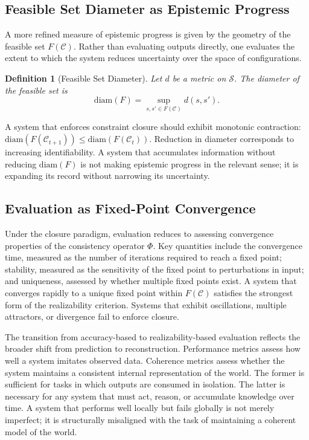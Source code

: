 \documentclass[12pt, oneside]{article}
\newtheorem{definition}{Definition}
\begin{document}
\subsection{Feasible Set Diameter as Epistemic Progress}

A more refined measure of epistemic progress is given by the geometry of the feasible set $F(\mathcal{C})$. Rather than evaluating outputs directly, one evaluates the extent to which the system reduces uncertainty over the space of configurations.

\begin{definition}[Feasible Set Diameter]
Let $d$ be a metric on $\mathcal{S}$. The diameter of the feasible set is
\begin{equation}
  \mathrm{diam}(F) = \sup_{s, s' \in F(\mathcal{C})} d(s, s').
\end{equation}
\end{definition}

A system that enforces constraint closure should exhibit monotonic contraction: $\mathrm{diam}(F(\mathcal{C}_{t+1})) \leq \mathrm{diam}(F(\mathcal{C}_t))$. Reduction in diameter corresponds to increasing identifiability. A system that accumulates information without reducing $\mathrm{diam}(F)$ is not making epistemic progress in the relevant sense; it is expanding its record without narrowing its uncertainty.

\subsection{Evaluation as Fixed-Point Convergence}

Under the closure paradigm, evaluation reduces to assessing convergence properties of the consistency operator $\Phi$. Key quantities include the convergence time, measured as the number of iterations required to reach a fixed point; stability, measured as the sensitivity of the fixed point to perturbations in input; and uniqueness, assessed by whether multiple fixed points exist. A system that converges rapidly to a unique fixed point within $F(\mathcal{C})$ satisfies the strongest form of the realizability criterion. Systems that exhibit oscillations, multiple attractors, or divergence fail to enforce closure.

The transition from accuracy-based to realizability-based evaluation reflects the broader shift from prediction to reconstruction. Performance metrics assess how well a system imitates observed data. Coherence metrics assess whether the system maintains a consistent internal representation of the world. The former is sufficient for tasks in which outputs are consumed in isolation. The latter is necessary for any system that must act, reason, or accumulate knowledge over time. A system that performs well locally but fails globally is not merely imperfect; it is structurally misaligned with the task of maintaining a coherent model of the world.
\end{document}
